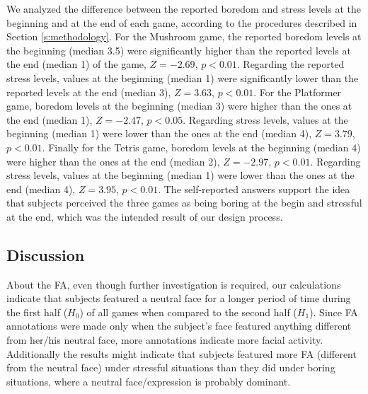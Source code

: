 We analyzed the difference between the reported boredom and stress levels at the beginning and at the end of each game, according to the procedures described in Section \ref{s:methodology}. For the Mushroom game, the reported boredom levels at the beginning (median 3.5) were significantly higher than the reported levels at the end (median 1) of the game, $Z=-2.69$, $p<0.01$. Regarding the reported stress levels, values at the beginning (median 1) were significantly lower than the reported levels at the end (median 3), $Z=3.63$, $p<0.01$. For the Platformer game, boredom levels at the beginning (median 3) were higher than the ones at the end (median 1), $Z=-2.47$, $p<0.05$. Regarding stress levels, values at the beginning (median 1) were lower than the ones at the end (median 4), $Z=3.79$, $p<0.01$. Finally for the Tetris game, boredom levels at the beginning (median 4) were higher than the ones at the end (median 2), $Z=-2.97$, $p<0.01$. Regarding stress levels, values at the beginning (median 1) were lower than the ones at the end (median 4), $Z=3.95$, $p<0.01$. The self-reported answers support the idea that subjects perceived the three games as being boring at the begin and stressful at the end, which was the intended result of our design process.

\subsection{Discussion}

About the FA, even though further investigation is required, our calculations indicate that subjects featured a neutral face for a longer period of time during the first half ($H_0$) of all games when compared to the second half ($H_1$). Since FA annotations were made only when the subject's face featured anything different from her/his neutral face, more annotations indicate more facial activity. Additionally the results might indicate that subjects featured more FA (different from the neutral face) under stressful situations than they did under boring situations, where a neutral face/expression is probably dominant.

